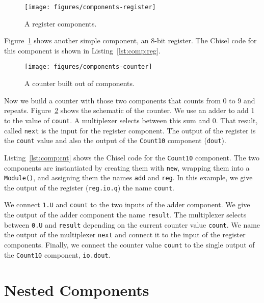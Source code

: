 \documentclass[%
    10pt,
    headinclude, footexclude,
    openright, %
    notitlepage,
    cleardoubleempty,
    headsepline,
    pointlessnumbers,
    bibtotoc, idxtotoc,
    ]{scrbook}
\newcommand{\scale}{0.7}
\newcommand{\code}[1]{{\lstinline[basicstyle=\small\ttfamily]{#1}}}
\begin{document}
\begin{figure}
  \centering
  \texttt{[image: figures/components-register]}
  \caption{A register components.}
  \label{fig:components-register}
\end{figure}


Figure~\ref{fig:components-register} shows another simple component, an 8-bit register.
The Chisel code for this component is shown in Listing~\ref{lst:comp:reg}.


\begin{figure}
  \centering
  \texttt{[image: figures/components-counter]}
  \caption{A counter built out of components.}
  \label{fig:components-counter}
\end{figure}


Now we build a counter with those two components that counts from 0 to 9 and repeats.
Figure~\ref{fig:components-counter} shows the schematic of the counter. We use an adder
to add 1 to the value of \code{count}. A multiplexer selects between this sum and 0.
That result, called \code{next} is the input for the register component. The output of the
register is the \code{count} value and also the output of the \code{Count10} component (\code{dout}).

Listing~\ref{lst:comp:cnt} shows the Chisel code for the \code{Count10} component.
The two components are instantiated by creating them with \code{new}, wrapping them
into a \code{Module()}, and assigning them the names \code{add} and \code{reg}.
In this example, we give the output of the register (\code{reg.io.q}) the name \code{count}.

We connect \code{1.U} and \code{count} to the two inputs of the adder component.
We give the output of the adder component the name \code{result}.
The multiplexer selects between \code{0.U} and \code{result} depending on the current counter
value \code{count}. We name the output of the multiplexer \code{next} and connect it
to the input of the register components. Finally, we connect the counter value \code{count}
to the single output of the \code{Count10} component, \code{io.dout}.



\section{Nested Components}
\end{document}
